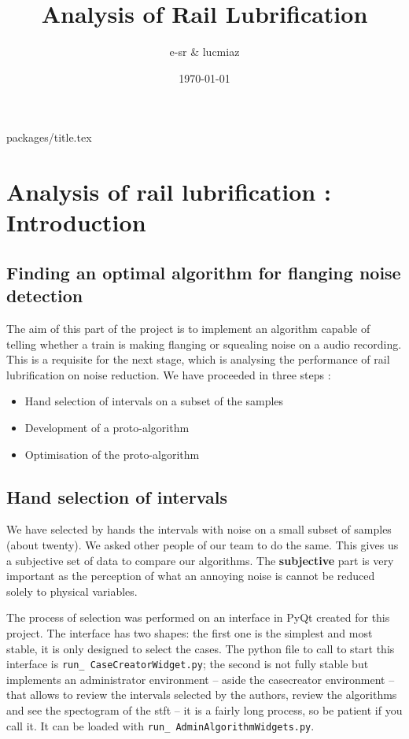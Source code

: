 \documentclass{article}\usepackage[]{graphicx}\usepackage[]{color}
\author{e-sr \& lucmiaz}
\date{\today}
\title{Analysis of Rail Lubrification}
\begin{document}
{packages/title.tex}

\tableofcontents
\newpage
\section{Analysis of rail lubrification : Introduction}

\subsection{\label{sec:algtest}Finding an optimal algorithm for flanging noise detection}
The aim of this part of the project is to implement an algorithm capable of telling whether a train is making flanging or squealing noise on a audio recording. This is a requisite for the next stage, which is analysing the performance of rail lubrification on noise reduction. We have proceeded in three steps :
\begin{itemize}
\item Hand selection of intervals on a subset of the samples

\item Development of a proto-algorithm

\item Optimisation of the proto-algorithm
\end{itemize}

\subsection{Hand selection of intervals}
We have selected by hands the intervals with noise on a small subset of samples (about twenty). We asked other people of our team to do the same. This gives us a subjective set of data to compare our algorithms. The {\bf subjective} part is very important as the perception of what an annoying noise is cannot be reduced solely to physical variables.

The process of selection was performed on an interface in PyQt created for this project. The interface has two shapes: the first one is the simplest and most stable, it is only designed to select the cases. The python file to call to start this interface is {\tt run\_ CaseCreatorWidget.py}; the second is not fully stable but implements an administrator environment -- aside the casecreator environment -- that allows to review the intervals selected by the authors, review the algorithms and see the spectogram of the stft -- it is a fairly long process, so be patient if you call it. It can be loaded with {\tt run\_ AdminAlgorithmWidgets.py}. 
\end{document}
